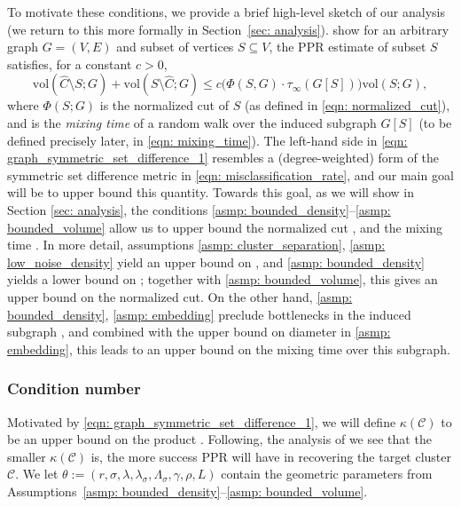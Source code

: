 \documentclass[11pt,twoside]{article}
\newcommand{\diam}{\rho}
\newcommand{\vol}{\mathrm{vol}}
\newcommand{\cut}{\mathrm{cut}}
\newcommand{\1}{\mathbf{1}}
\newcommand{\Xbf}{X}             %
\newcommand{\Cset}{\mathcal{C}}
\newcommand{\Csig}{\Cset_{\sigma}}
\newcommand{\Cest}{\widehat{C}}
\begin{document}
To motivate these conditions, we provide a brief high-level sketch
of our analysis (we return to this more formally in Section~\ref{sec: analysis}).
\citet{zhu2013} show for an arbitrary graph $G =
(V,E)$ and subset of vertices $S \subseteq V$, the PPR estimate \smash{$\Cest$}
of subset $S$ satisfies, for a constant $c>0$,
\begin{equation}
\label{eqn: graph_symmetric_set_difference_1}
\vol(\Cest \setminus S; G) + \vol(S \setminus \Cest; G) \leq c \bigl( \Phi(S,G)
\cdot \tau_{\infty}(G[S])\bigr) \vol(S;G),
\end{equation}
where $\Phi(S;G)$ is the normalized cut of $S$ (as defined in \eqref{eqn:
  normalized_cut}), and  is  the \emph{mixing
  time} of a random walk over the induced subgraph $G[S]$ (to be defined
precisely later, in \eqref{eqn: mixing_time}).  The left-hand side in
\eqref{eqn:  graph_symmetric_set_difference_1} resembles a (degree-weighted) 
form of the symmetric set difference metric in \eqref{eqn:
  misclassification_rate}, and our main goal will be to upper bound 
  this quantity. 
  Towards this goal, as we will show in Section \ref{sec:
  analysis}, the conditions \ref{asmp: bounded_density}--\ref{asmp:
  bounded_volume} allow us to upper bound the normalized cut 
\smash{$\Phi(\Csig[\Xbf]; G_{n,r})$}, and the mixing time 
\smash{$\tau_{\infty}(G_{n,r}[\Csig[\Xbf]])$}. In more detail, assumptions  
\ref{asmp: cluster_separation}, \ref{asmp: low_noise_density} yield an upper
bound on \smash{$\cut(\Csig[\Xbf]; G_{n,r})$}, and \ref{asmp: bounded_density}
yields a lower bound on \smash{$\vol(\Csig[\Xbf]; G_{n,r})$}; together with 
\ref{asmp: bounded_volume}, this gives an upper bound on the normalized cut.  On 
the other hand, \ref{asmp: bounded_density}, \ref{asmp: embedding} preclude
bottlenecks in the induced subgraph \smash{$G_{n,r}[\Csig[\Xbf]]$}, and combined
with the upper bound on diameter in \ref{asmp: embedding}, this leads to an upper bound on
the mixing time over this subgraph.

\subsubsection{Condition number} 
Motivated by \eqref{eqn:
  graph_symmetric_set_difference_1}, we will define $\kappa(\Cset)$ to be an
upper bound on the product \smash{$\Phi(\Csig[\Xbf]; G_{n,r}) \cdot
  \tau_{\infty}(G_{n,r}[\Csig[\Xbf]])$}. Following, the analysis of \citet{zhu2013}
  we see that the smaller $\kappa(\Cset)$ is, the
more success PPR will have in recovering the target cluster $\Cset$. We let $\theta := (r, \sigma,
\lambda, \lambda_{\sigma}, \Lambda_{\sigma}, \gamma, \diam, L)$ contain the
geometric parameters from Assumptions~\ref{asmp:  bounded_density}--\ref{asmp:
  bounded_volume}.  
\end{document}
